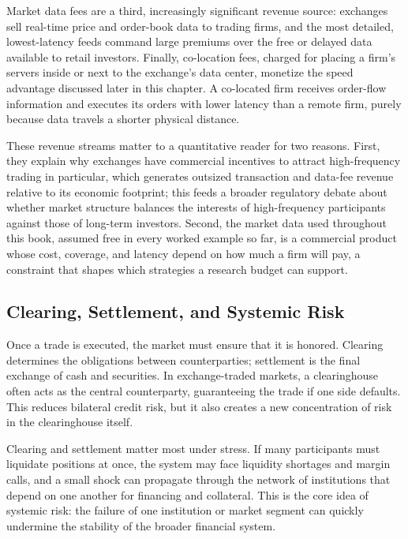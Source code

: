 \documentclass[../ai_in_finance]{subfiles}
\begin{document}
Market data fees are a third, increasingly significant revenue source: exchanges sell real-time price and order-book data to trading firms, and the most detailed, lowest-latency feeds command large premiums over the free or delayed data available to retail investors. Finally, co-location fees, charged for placing a firm's servers inside or next to the exchange's data center, monetize the speed advantage discussed later in this chapter. A co-located firm receives order-flow information and executes its orders with lower latency than a remote firm, purely because data travels a shorter physical distance.

These revenue streams matter to a quantitative reader for two reasons. First, they explain why exchanges have commercial incentives to attract high-frequency trading in particular, which generates outsized transaction and data-fee revenue relative to its economic footprint; this feeds a broader regulatory debate about whether market structure balances the interests of high-frequency participants against those of long-term investors. Second, the market data used throughout this book, assumed free in every worked example so far, is a commercial product whose cost, coverage, and latency depend on how much a firm will pay, a constraint that shapes which strategies a research budget can support.

\subsection{Clearing, Settlement, and Systemic Risk}
\label{sec:clearing}

Once a trade is executed, the market must ensure that it is honored. Clearing determines the obligations between counterparties; settlement is the final exchange of cash and securities. In exchange-traded markets, a clearinghouse often acts as the central counterparty, guaranteeing the trade if one side defaults. This reduces bilateral credit risk, but it also creates a new concentration of risk in the clearinghouse itself.

Clearing and settlement matter most under stress. If many participants must liquidate positions at once, the system may face liquidity shortages and margin calls, and a small shock can propagate through the network of institutions that depend on one another for financing and collateral. This is the core idea of systemic risk: the failure of one institution or market segment can quickly undermine the stability of the broader financial system.
\end{document}
